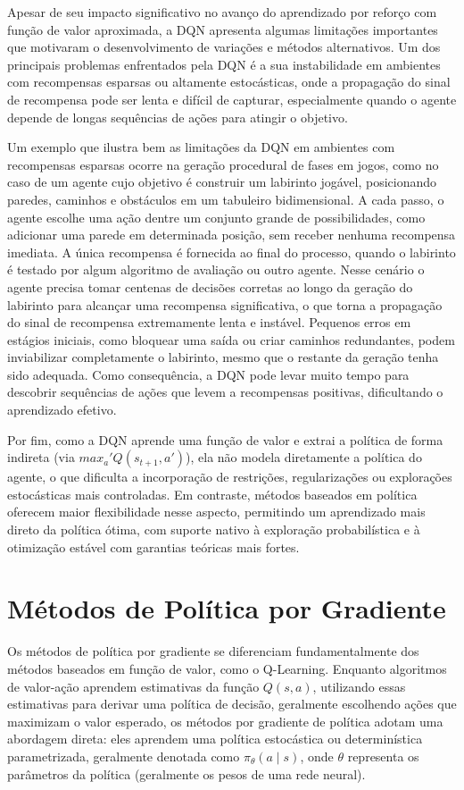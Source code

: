 Apesar de seu impacto significativo no avanço do aprendizado por reforço com função de valor aproximada, 
a DQN apresenta algumas limitações importantes que motivaram o desenvolvimento de variações e métodos alternativos. 
Um dos principais problemas enfrentados pela DQN é a sua instabilidade em ambientes com recompensas esparsas ou altamente 
estocásticas, onde a propagação do sinal de recompensa pode ser lenta e difícil de capturar, especialmente quando o 
agente depende de longas sequências de ações para atingir o objetivo.

Um exemplo que ilustra bem as limitações da DQN em ambientes com recompensas esparsas ocorre na geração procedural de fases em jogos,
como no caso de  
um agente cujo objetivo é construir um labirinto jogável, posicionando paredes, caminhos e obstáculos em um tabuleiro bidimensional. 
A cada passo, o agente escolhe uma ação dentre um conjunto grande de possibilidades, como adicionar uma parede em determinada posição, 
sem receber nenhuma recompensa imediata. 
A única recompensa é fornecida ao final do processo, quando o labirinto é testado por algum algoritmo de avaliação ou outro agente.
Nesse cenário o agente precisa tomar centenas de decisões corretas ao longo da geração do labirinto para alcançar uma 
recompensa significativa, o que torna a propagação do sinal de recompensa extremamente lenta e instável. 
Pequenos erros em estágios iniciais, como bloquear uma saída ou criar caminhos redundantes, podem inviabilizar 
completamente o labirinto, mesmo que o restante da geração tenha sido adequada.
Como consequência, a DQN pode levar muito tempo para descobrir sequências de ações que levem a recompensas positivas, 
dificultando o aprendizado efetivo.

Por fim, como a DQN aprende uma função de valor e extrai a política de forma indireta (via \( max_a' Q(s_{t+1}, a')\)), 
ela não modela diretamente a política do agente, o que dificulta a incorporação de restrições, 
regularizações ou explorações estocásticas mais controladas. Em contraste, métodos baseados em política 
oferecem maior flexibilidade nesse aspecto, permitindo um aprendizado mais direto da 
política ótima, com suporte nativo à exploração probabilística e à otimização estável com garantias teóricas mais fortes.



\section{Métodos de Política por Gradiente}
Os métodos de política por gradiente se diferenciam fundamentalmente dos métodos baseados em função de valor, como o Q-Learning. 
Enquanto algoritmos de valor-ação aprendem estimativas da função \(Q(s,a)\), utilizando essas estimativas para derivar uma política 
de decisão, geralmente escolhendo ações que maximizam o valor esperado, os métodos por gradiente de política adotam uma abordagem 
direta: eles aprendem uma política estocástica ou determinística parametrizada, geralmente denotada como 
\(\pi_{\theta}(a \mid s)\), onde \(\theta\) representa os parâmetros da política (geralmente os pesos de uma rede neural).

